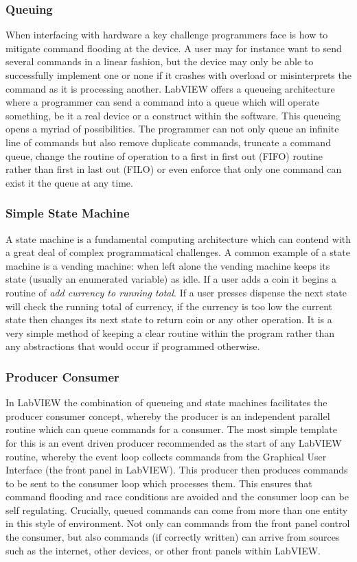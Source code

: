 \subsubsection{Queuing}

When interfacing with hardware a key challenge programmers face is how to mitigate command flooding at the device.
A user may for instance want to send several commands in a linear fashion, but the device may only be able to successfully implement one or none if it crashes with overload or misinterprets the command as it is processing another.
LabVIEW offers a queueing architecture where a programmer can send a command into a queue which will operate something, be it a real device or a construct within the software.
This queueing opens a myriad of possibilities.
The programmer can not only queue an infinite line of commands but also remove duplicate commands, truncate a command queue, change the routine of operation to a first in first out (FIFO) routine rather than first in last out (FILO) or even enforce that only one command can exist it the queue at any time.

\subsubsection{Simple State Machine}

A state machine is a fundamental computing architecture which can contend with a great deal of complex programmatical challenges.
A common example of a state machine is a vending machine: when left alone the vending machine keeps its state (usually an enumerated variable) as idle.
If a user adds a coin it begins a routine of \textit{add currency to running total}.
If a user presses dispense the next state will check the running total of currency, if the currency is too low the current state then changes its next state to return coin or any other operation.
It is a very simple method of keeping a clear routine within the program rather than any abstractions that would occur if programmed otherwise.


\subsubsection{Producer Consumer}

In LabVIEW the combination of queueing and state machines facilitates the producer consumer concept, whereby the producer is an independent parallel routine which can queue commands for a consumer.
The most simple template for this is an event driven producer recommended as the start of any LabVIEW routine, whereby the event loop collects commands from the Graphical User Interface (the front panel in LabVIEW).
This producer then produces commands to be sent to the consumer loop which processes them.
This ensures that command flooding and race conditions are avoided and the consumer loop can be self regulating.
Crucially, queued commands can come from more than one entity in this style of environment.
Not only can commands from the front panel control the consumer, but also commands (if correctly written) can arrive from sources such as the internet, other devices, or other front panels within LabVIEW.

